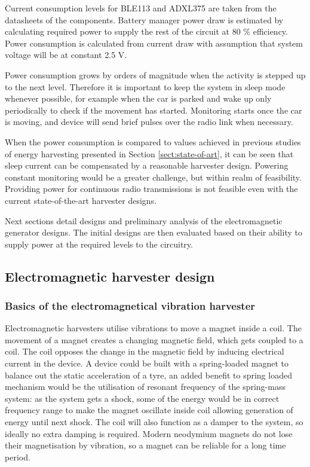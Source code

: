 Current consumption levels for BLE113 and ADXL375 are taken from the datasheets of the components. Battery manager power draw is estimated by calculating required power to supply the rest of the circuit at 80 \% efficiency. Power consumption is calculated from current draw with assumption that system voltage will be at constant 2.5 V.

Power consumption grows by orders of magnitude when the activity is stepped up to the next level. Therefore it is important to keep the system in sleep mode whenever possible, for example when the car is parked and wake up only periodically to check if the movement has started. Monitoring starts once the car is moving, and device will send brief pulses over the radio link when necessary.

When the power consumption is compared to values achieved in previous studies of energy harvesting presented in Section \ref{sect:state-of-art}, it can be seen that sleep current can be compensated by a reasonable harvester design. Powering constant monitoring would be a greater challenge, but within realm of feasibility. Providing power for continuous radio transmissions is not feasible even with the current state-of-the-art harvester designs. 

Next sections detail designs and preliminary analysis of the electromagnetic generator designs. The initial designs are then evaluated based on their ability to supply power at the required levels to the circuitry.

\subsection{Electromagnetic harvester design}
\subsubsection{Basics of the electromagnetical vibration harvester}
Electromagnetic harvesters utilise vibrations to move a magnet inside a coil. The movement of a magnet creates a changing magnetic field, which gets coupled to a coil. The coil opposes the change in the magnetic field by inducing electrical current in the device. A device could be built with a spring-loaded magnet to balance out the static acceleration of a tyre, an added benefit to spring loaded mechanism would be the utilisation of resonant frequency of the spring-mass system: as the system gets a shock, some of the energy would be in correct frequency range to make the magnet oscillate inside coil allowing generation of energy until next shock. The coil will also function as a damper to the system, so ideally no extra damping is required. Modern neodymium magnets do not lose their magnetisation by vibration, so a magnet can be reliable for a long time period. 

